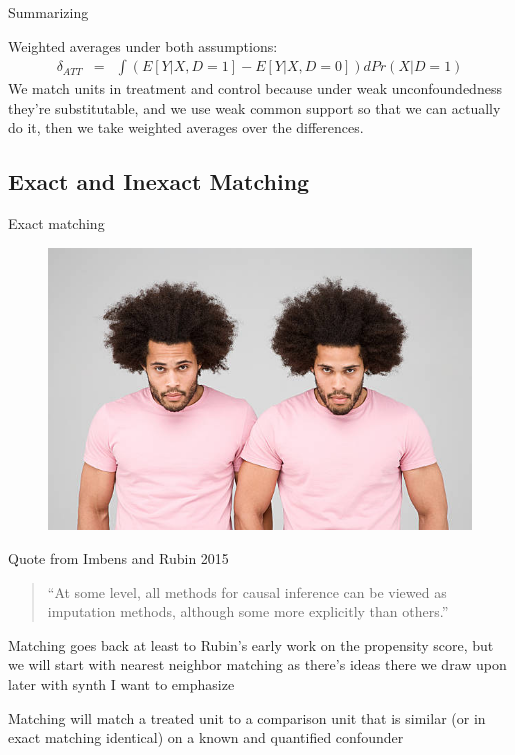 \documentclass{beamer}
\begin{document}
\begin{frame}{Summarizing}


Weighted averages under both assumptions:
		\begin{eqnarray*}
		\delta_{ATT} &=& \int \left(E[Y|X,D=1] - E[Y|X,D=0]\right)dPr(X|D=1)
		\end{eqnarray*}
We match units in treatment and control because under weak unconfoundedness they're substitutable, and we use weak common support so that we can actually do it, then we take weighted averages over the differences.  
		
\end{frame}



\subsection{Exact and Inexact Matching}

\begin{frame}{Exact matching}

\begin{figure}[!t]\centering
\includegraphics[scale=1.1]{./lecture_includes/identical_twins}
\end{figure}

\end{frame}

\begin{frame}{Quote from Imbens and Rubin 2015}

\begin{quote}
``At some level, all methods for causal inference can be viewed as imputation methods, although some more explicitly than others.''
\end{quote}

\bigskip

Matching goes back at least to Rubin's early work on the propensity score, but we will start with nearest neighbor matching as there's ideas there we draw upon later with synth I want to emphasize

\bigskip

Matching will match a treated unit to a comparison unit that is similar (or in exact matching identical) on a known and quantified confounder



\end{frame}
\end{document}
